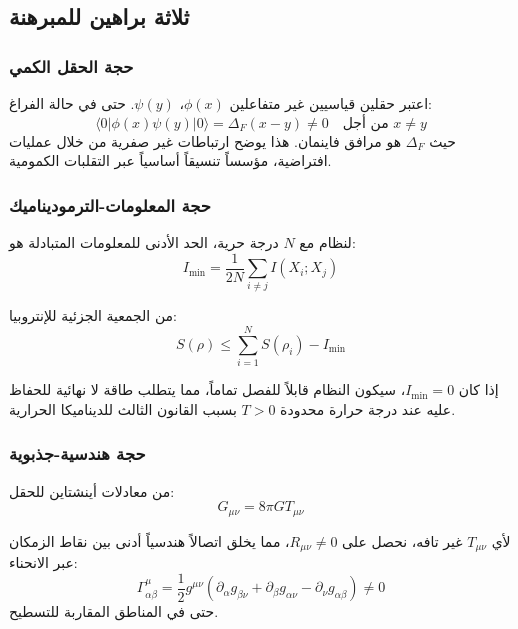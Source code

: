 \documentclass[11pt,a4paper]{article}
\begin{document}
	\subsection{ثلاثة براهين للمبرهنة}
	
	\subsubsection{حجة الحقل الكمي}
	
	اعتبر حقلين قياسيين غير متفاعلين $\phi(x)$، $\psi(y)$. حتى في حالة الفراغ:
	\begin{equation}
		\langle 0 | \phi(x) \psi(y) | 0 \rangle = \Delta_F(x-y) \neq 0 \quad \text{من أجل } x \neq y
	\end{equation}
	حيث $\Delta_F$ هو مرافق فاينمان. هذا يوضح ارتباطات غير صفرية من خلال عمليات افتراضية، مؤسساً تنسيقاً أساسياً عبر التقلبات الكمومية.
	
	\subsubsection{حجة المعلومات-الترموديناميك}
	
	لنظام مع $N$ درجة حرية، الحد الأدنى للمعلومات المتبادلة هو:
	\begin{equation}
		I_{\min} = \frac{1}{2N} \sum_{i \neq j} I(X_i; X_j)
	\end{equation}
	
	من الجمعية الجزئية للإنتروبيا:
	\begin{equation}
		S(\rho) \leq \sum_{i=1}^N S(\rho_i) - I_{\min}
	\end{equation}
	
	إذا كان $I_{\min} = 0$، سيكون النظام قابلاً للفصل تماماً، مما يتطلب طاقة لا نهائية للحفاظ عليه عند درجة حرارة محدودة $T > 0$ بسبب القانون الثالث للديناميكا الحرارية.
	
	\subsubsection{حجة هندسية-جذبوية}
	
	من معادلات أينشتاين للحقل:
	\begin{equation}
		G_{\mu\nu} = 8\pi G T_{\mu\nu}
	\end{equation}
	
	لأي $T_{\mu\nu}$ غير تافه، نحصل على $R_{\mu\nu} \neq 0$، مما يخلق اتصالاً هندسياً أدنى بين نقاط الزمكان عبر الانحناء:
	\begin{equation}
		\Gamma^\mu_{\alpha\beta} = \frac{1}{2} g^{\mu\nu}(\partial_\alpha g_{\beta\nu} + \partial_\beta g_{\alpha\nu} - \partial_\nu g_{\alpha\beta}) \neq 0
	\end{equation}
	حتى في المناطق المقاربة للتسطيح.
	
\end{document}
